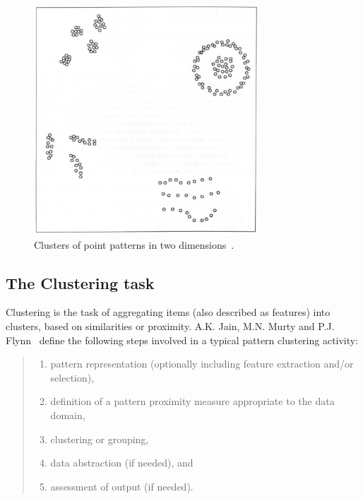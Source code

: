 \begin{figure}[h]
  \begin{center}
    \includegraphics[width=0.75\textwidth]{figures/clusters.png}
    \caption{Clusters of point patterns in two dimensions~\cite[p 2]{Jain99clusterreview}.}
    \label{fig:clusters}
  \end{center}
\end{figure}



\subsection{The Clustering task}

Clustering is the task of aggregating items (also described as features) into clusters, based on similarities or proximity. A.K. Jain, M.N. Murty and P.J. Flynn~\cite{Jain99clusterreview} define the following steps involved in a typical pattern clustering activity:
 
\begin{quote}
\begin{enumerate}
\item pattern representation (optionally including feature extraction and/or selection), 
\item definition of a pattern proximity measure appropriate to the data domain, 
\item clustering or grouping, 
\item data abstraction (if needed), and 
\item assessment of output (if needed). 
\end{enumerate}
\end{quote}



